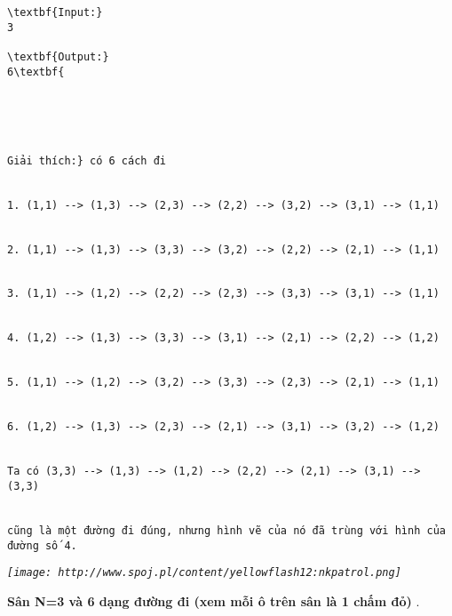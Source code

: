 \begin{verbatim}
\textbf{Input:}
3

\textbf{Output:}
6\textbf{





Giải thích:} có 6 cách đi


1. (1,1) --> (1,3) --> (2,3) --> (2,2) --> (3,2) --> (3,1) --> (1,1)


2. (1,1) --> (1,3) --> (3,3) --> (3,2) --> (2,2) --> (2,1) --> (1,1)


3. (1,1) --> (1,2) --> (2,2) --> (2,3) --> (3,3) --> (3,1) --> (1,1)


4. (1,2) --> (1,3) --> (3,3) --> (3,1) --> (2,1) --> (2,2) --> (1,2)


5. (1,1) --> (1,2) --> (3,2) --> (3,3) --> (2,3) --> (2,1) --> (1,1)


6. (1,2) --> (1,3) --> (2,3) --> (2,1) --> (3,1) --> (3,2) --> (1,2)


Ta có (3,3) --> (1,3) --> (1,2) --> (2,2) --> (2,1) --> (3,1) --> (3,3) 


cũng là một đường đi đúng, nhưng hình vẽ của nó đã trùng với hình của đường số 4.\end{verbatim}

\emph{
\texttt{[image: http://www.spoj.pl/content/yellowflash12:nkpatrol.png]}}

\textbf{    Sân N=3 và 6 dạng đường đi (xem mỗi ô trên sân là 1 chấm đỏ)   }   .